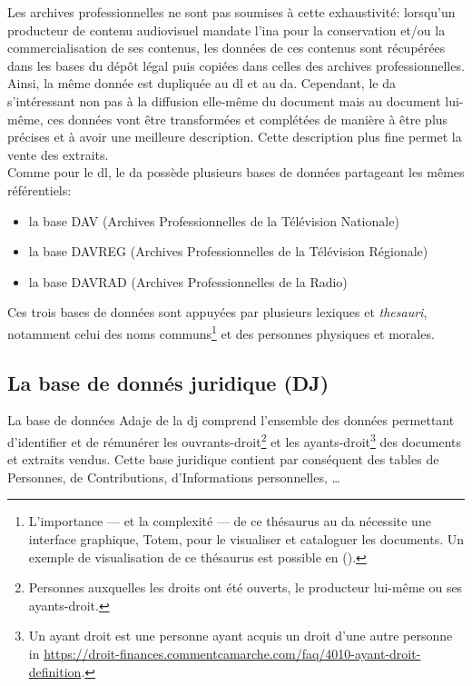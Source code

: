Les archives professionnelles ne sont pas soumises à cette exhaustivité: lorsqu'un producteur de contenu audiovisuel mandate l'\ac{ina} pour la conservation et/ou la commercialisation de ses contenus, les données de ces contenus sont récupérées dans les bases du dépôt légal puis copiées dans celles des archives professionnelles. Ainsi, la même donnée est dupliquée au \ac{dl} et au \ac{da}. Cependant, le \ac{da} s'intéressant non pas à la diffusion elle-même du document mais au document lui-même, ces données vont être transformées et complétées de manière à être plus précises et à avoir une meilleure description. Cette description plus fine permet la vente des extraits.\\

Comme pour le \ac{dl}, le \ac{da} possède plusieurs bases de données partageant les mêmes référentiels:
\begin{itemize}
	\item la base DAV (Archives Professionnelles de la Télévision Nationale)
	\item la base DAVREG (Archives Professionnelles de la Télévision Régionale)
	\item la base DAVRAD (Archives Professionnelles de la Radio)
\end{itemize}
\bigskip

Ces trois bases de données sont appuyées par plusieurs lexiques et \textit{thesauri}, notamment celui des noms communs\footnote{L'importance --- et la complexité --- de ce thésaurus au \ac{da} nécessite une interface graphique, \og Totem\fg{}, pour le visualiser et cataloguer les documents. Un exemple de visualisation de ce thésaurus est possible en  ().} et des personnes physiques et morales.

\subsection{\label{I-B-2-c}La base de donnés juridique (DJ)}

La base de données \og Adaje\fg{} de la \ac{dj} comprend l'ensemble des données permettant d'identifier et de rémunérer les ouvrants-droit\footnote{Personnes auxquelles les droits ont été ouverts, le producteur lui-même ou ses ayants-droit.} et les ayants-droit\footnote{\og Un ayant droit est une personne ayant acquis un droit d'une autre personne\fg{} in \url{https://droit-finances.commentcamarche.com/faq/4010-ayant-droit-definition}.} des documents et extraits vendus. Cette base juridique contient par conséquent des tables de Personnes, de Contributions, d'Informations personnelles, \dots\\

